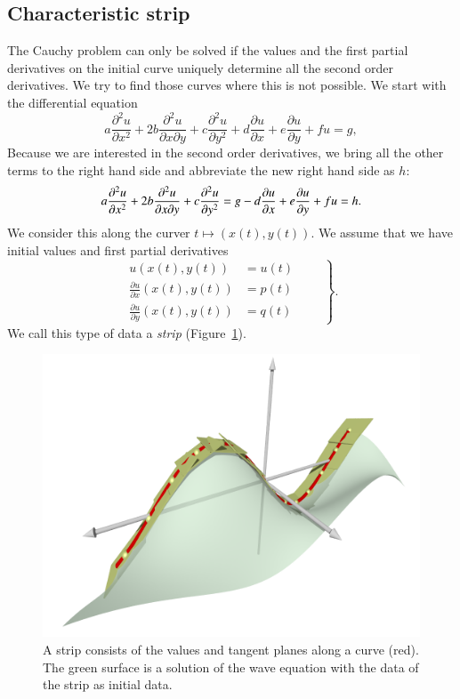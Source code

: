 \subsection{Characteristic strip}
The Cauchy problem can only be solved if the values and the
first partial derivatives on the initial curve uniquely determine 
all the second order derivatives.
We try to find those curves where this is not possible.
We start with the differential equation
\begin{equation}
a\frac{\partial^2 u}{\partial x^2}
+
2b\frac{\partial^2 u}{\partial x\partial y}
+
c\frac{\partial^2 u}{\partial y^2}
+
d\frac{\partial u}{\partial x}
+
e\frac{\partial u}{\partial y}
+
fu
=g,
\label{charequation}
\end{equation}
Because we are interested in the second order derivatives,
we bring all the other terms to the right hand side and
abbreviate the new right hand side as $h$:
\begin{equation}
a\frac{\partial^2 u}{\partial x^2}
+
2b\frac{\partial^2 u}{\partial x\partial y}
+
c\frac{\partial^2 u}{\partial y^2}
=
g
-
d\frac{\partial u}{\partial x}
+
e\frac{\partial u}{\partial y}
+
fu
=h.
\notag
\end{equation}
We consider this along the curver
$t\mapsto(x(t),y(t))$.
We assume that we have initial values and first partial derivatives
\begin{equation}
\left.
\begin{aligned}
u(x(t),y(t))&=u(t)\\
\frac{\partial u}{\partial x}(x(t),y(t)) &= p(t)\\
\frac{\partial u}{\partial y}(x(t),y(t)) &= q(t)
\end{aligned}
\qquad
\right\}.
\label{charanfangs}
\end{equation}
We call this type of data a {\em strip}
(Figure~\ref{skript:streifen}).

\begin{figure}
\centering
\includegraphics[width=\hsize]{../common/3d/streifen0.png}
\caption{A strip consists of the values and tangent planes
along a curve (red).
The green surface is a solution of the wave equation with the
data of the strip as initial data.
\label{skript:streifen}}
\end{figure}

